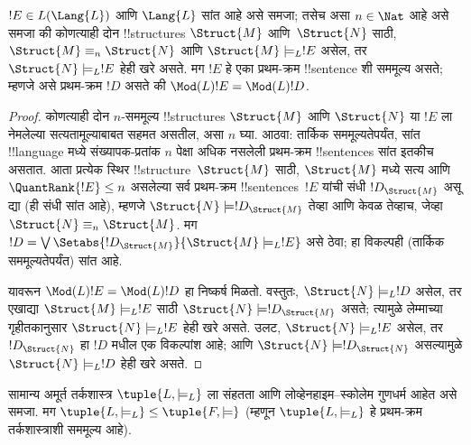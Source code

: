 \documentclass[../../../include/open-logic-section]{subfiles}
\begin{document}


\begin{lem}
$!E \in L(\Lang{L})$ आणि $\Lang{L}$ सांत आहे असे समजा; तसेच असा
$n \in \Nat$ आहे असे समजा की कोणत्याही दोन !!{structure}s
$\Struct{M}$ आणि~$\Struct{N}$ साठी, $\Struct{M} \equiv_n
\Struct{N}$ आणि $\Struct{M} \models_L !E$ असेल, तर $\Struct{N}
\models_L !E$ हेही खरे असते. मग $!E$ हे एका प्रथम-क्रम
!!{sentence} शी सममूल्य असते; म्हणजे असे प्रथम-क्रम $!D$ असते की
$\Mod(L){!E} = \Mod(L){!D}$.
\end{lem}

\begin{proof}
कोणत्याही दोन $n$-सममूल्य !!{structure}s $\Struct{M}$ आणि
$\Struct{N}$ या $!E$ ला नेमलेल्या सत्यतामूल्याबाबत सहमत असतील, असा $n$
घ्या.  आठवा: तार्किक सममूल्यतेपर्यंत,
सांत !!{language} मध्ये संख्यापक-प्रतांक $n$ पेक्षा अधिक नसलेली प्रथम-क्रम
!!{sentence}s सांत इतकीच असतात. आता प्रत्येक स्थिर
!!{structure}~$\Struct{M}$ साठी, $\Struct{M}$ मध्ये सत्य आणि
$\QuantRank{!E} \le n$ असलेल्या सर्व प्रथम-क्रम !!{sentence}s~$!E$
यांची संधी $!D_{\Struct{M}}$ असू द्या (ही संधी सांत आहे), म्हणजे
$\Struct{N} \models !D_{\Struct{M}}$ तेव्हा आणि केवळ तेव्हाच, जेव्हा
$\Struct{N} \equiv_n \Struct{M}$. मग $!D = \textstyle\bigvee
\Setabs{!D_{\Struct{M}}}{\Struct{M} \models_L !E}$ असे ठेवा; हा विकल्पही
(तार्किक सममूल्यतेपर्यंत) सांत आहे.

यावरून $\Mod(L){!E} = \Mod(L){!D}$ हा निष्कर्ष मिळतो. वस्तुतः,
$\Struct{N} \models_L !D$ असेल, तर एखाद्या $\Struct{M} \models_L
!E$ साठी $\Struct{N} \models !D_{\Struct{M}}$ असते; त्यामुळे
लेम्माच्या गृहीतकानुसार $\Struct{N} \models_L !E$ हेही खरे असते.
उलट, $\Struct{N} \models_L !E$ असेल, तर $!D_\Struct{N}$ हा $!D$ मधील
एक विकल्पांश आहे; आणि $\Struct{N} \models !D_\Struct{N}$ असल्यामुळे
$\Struct{N} \models_L !D$ हेही खरे असते.
\end{proof}

\begin{thm}[लिंडस्ट्रॉमचे प्रमेय]
   सामान्य अमूर्त तर्कशास्त्र
  $\tuple{L, \models_L}$ ला संहतता आणि लोव्हेनहाइम--स्कोलेम गुणधर्म
  आहेत असे समजा. मग $\tuple{L, \models_L} \le \tuple{F, \models}$
  (म्हणून $\tuple{L, \models_L}$ हे प्रथम-क्रम तर्कशास्त्राशी सममूल्य
  आहे).
\end{thm}
\end{document}
